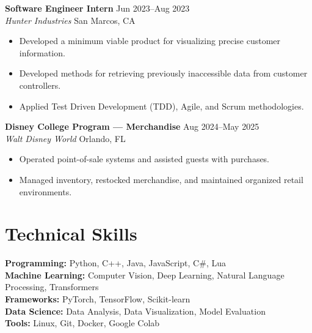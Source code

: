 \documentclass[11pt]{article}
\begin{document}
\noindent
    \textbf{Software Engineer Intern} \hfill Jun 2023--Aug 2023\\
    \textit{Hunter Industries} \hfill San Marcos, CA
    \begin{itemize}
        \item Developed a minimum viable product for visualizing precise customer information.
        \item Developed methods for retrieving previously inaccessible data from customer controllers.
        \item Applied Test Driven Development (TDD), Agile, and Scrum methodologies.
    \end{itemize}

\vspace{0.4em}

\noindent
    \textbf{Disney College Program --- Merchandise} \hfill Aug 2024--May 2025\\
    \textit{Walt Disney World} \hfill Orlando, FL
    \begin{itemize}
        \item Operated point-of-sale systems and assisted guests with purchases.
        \item Managed inventory, restocked merchandise, and maintained organized retail environments.
    \end{itemize}


\section{Technical Skills}

\noindent
    \textbf{Programming:} Python, C++, Java, JavaScript, C\#, Lua\\
    \textbf{Machine Learning:} Computer Vision, Deep Learning, Natural Language Processing, Transformers\\
    \textbf{Frameworks:} PyTorch, TensorFlow, Scikit-learn\\
    \textbf{Data Science:} Data Analysis, Data Visualization, Model Evaluation\\
    \textbf{Tools:} Linux, Git, Docker, Google Colab

\end{document}
